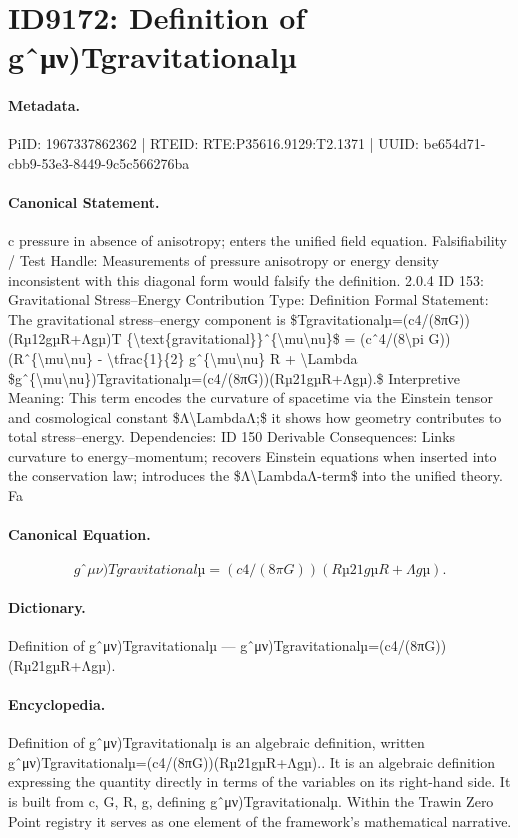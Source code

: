 \section*{ID9172: Definition of gˆμν)Tgravitationalµ}
\paragraph{Metadata.}
PiID: 1967337862362 | RTEID: RTE:P35616.9129:T2.1371 | UUID: be654d71-cbb9-53e3-8449-9c5c566276ba

\paragraph{Canonical Statement.}
c pressure in absence of anisotropy; enters the unified field equation. Falsifiability / Test Handle: Measurements of pressure anisotropy or energy density inconsistent with this diagonal form would falsify the definition. 2.0.4 ID 153: Gravitational Stress–Energy Contribution Type: Definition Formal Statement: The gravitational stress–energy component is \$Tgravitationalµ=(c4/(8πG))(Rµ12gµR+Λgµ)T \{\textbackslash{}text\{gravitational\}\}ˆ\{\textbackslash{}mu\textbackslash{}nu\}\$ = (cˆ4/(8\textbackslash{}pi G))(Rˆ\{\textbackslash{}mu\textbackslash{}nu\} - \textbackslash{}tfrac\{1\}\{2\} gˆ\{\textbackslash{}mu\textbackslash{}nu\} R + \textbackslash{}Lambda \$gˆ\{\textbackslash{}mu\textbackslash{}nu\})Tgravitationalµ=(c4/(8πG))(Rµ21gµR+Λgµ).\$ Interpretive Meaning: This term encodes the curvature of spacetime via the Einstein tensor and cosmological constant \$Λ\textbackslash{}LambdaΛ;\$ it shows how geometry contributes to total stress–energy. Dependencies: ID 150 Derivable Consequences: Links curvature to energy–momentum; recovers Einstein equations when inserted into the conservation law; introduces the \$Λ\textbackslash{}LambdaΛ-term\$ into the unified theory. Fa

\paragraph{Canonical Equation.}
\[
gˆ{\mu\nu})Tgravitationalµ=(c4/(8πG))(Rµ21gµR+Λgµ).
\]

\paragraph{Dictionary.}
Definition of gˆμν)Tgravitationalµ — gˆμν)Tgravitationalµ=(c4/(8πG))(Rµ21gµR+Λgµ).

\paragraph{Encyclopedia.}
Definition of gˆμν)Tgravitationalµ is an algebraic definition, written gˆμν)Tgravitationalµ=(c4/(8πG))(Rµ21gµR+Λgµ).. It is an algebraic definition expressing the quantity directly in terms of the variables on its right-hand side. It is built from c, G, R, g, defining gˆμν)Tgravitationalµ. Within the Trawin Zero Point registry it serves as one element of the framework's mathematical narrative.
